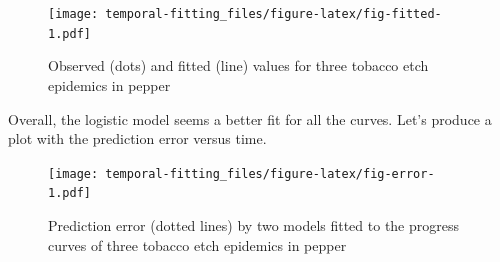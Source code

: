 \documentclass[
  letterpaper,
]{book}
\newenvironment{Shaded}{\begin{snugshade}}{\end{snugshade}}
\newcommand{\AttributeTok}[1]{\textcolor[rgb]{0.40,0.45,0.13}{#1}}
\newcommand{\CommentTok}[1]{\textcolor[rgb]{0.37,0.37,0.37}{#1}}
\newcommand{\DecValTok}[1]{\textcolor[rgb]{0.68,0.00,0.00}{#1}}
\newcommand{\FloatTok}[1]{\textcolor[rgb]{0.68,0.00,0.00}{#1}}
\newcommand{\FunctionTok}[1]{\textcolor[rgb]{0.28,0.35,0.67}{#1}}
\newcommand{\NormalTok}[1]{\textcolor[rgb]{0.00,0.23,0.31}{#1}}
\newcommand{\SpecialCharTok}[1]{\textcolor[rgb]{0.37,0.37,0.37}{#1}}
\newcommand{\StringTok}[1]{\textcolor[rgb]{0.13,0.47,0.30}{#1}}
\begin{document}
\begin{figure}

{\centering \texttt{[image: temporal-fitting\_files/figure-latex/fig-fitted-1.pdf]}

}

\caption{\label{fig-fitted}Observed (dots) and fitted (line) values for
three tobacco etch epidemics in pepper}

\end{figure}

Overall, the logistic model seems a better fit for all the curves. Let's
produce a plot with the prediction error versus time.

\begin{Shaded}
\end{Shaded}

\begin{figure}

{\centering \texttt{[image: temporal-fitting\_files/figure-latex/fig-error-1.pdf]}

}

\caption{\label{fig-error}Prediction error (dotted lines) by two models
fitted to the progress curves of three tobacco etch epidemics in pepper}

\end{figure}
\end{document}
